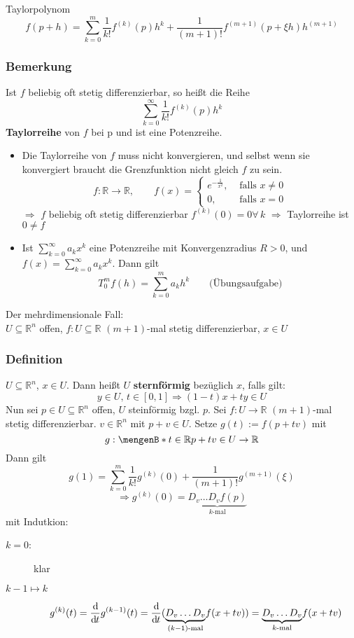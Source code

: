 Taylorpolynom
\[
	f(p+h)=\sum_{k=0}^{m}\frac{1}{k!}f^{(k)}(p)h^k + \frac{1}{(m+1)!}f^{(m+1)}(p+ \xi h)h^{(m+1)}
\]
\subsubsection{Bemerkung} %
\label{ssub:bemerkung}
Ist $f$ beliebig oft stetig differenzierbar, so heißt die Reihe
\[
	\sum^{\infty}_{k=0}\frac{1}{k!}f^{(k)}(p)h^k
\]
{\bfseries Taylorreihe} von $f$ bei p und ist eine Potenzreihe.
\begin{itemize}
	\item Die Taylorreihe von $f$ muss nicht konvergieren, und selbst wenn sie konvergiert braucht die Grenzfunktion nicht gleich $f$ zu sein.
	\[
		f:\mathbb{R}\to \mathbb{R}, \qquad f(x) = \begin{cases}
			e^{-\frac{1}{x^2}}, &\text{ falls }x \neq 0\\ 0, &\text{ falls }x=0 \end{cases}
	\] 
	$\Rightarrow $ $f$ beliebig oft stetig differenzierbar $f^{(k)}(0)=0 \forall\, k$
	$\Rightarrow $ Taylorreihe ist $0 \neq f$
	\item Ist $\sum_{k=0}^{\infty}a_kx^k$ eine Potenzreihe mit Konvergenzradius $R>0$, und $f(x)= \sum_{k=0}^{\infty}a_kx^k$. Dann gilt
	\[
		T_0^mf(h)=\sum_{k=0}^{m}a_kh^k \qquad \text{(Übungsaufgabe)}
	\]
\end{itemize}
Der mehrdimensionale Fall: \\
$ U \subseteq \mathbb{R}^n$ offen, $f:U \subseteq \mathbb{R}$ $(m+1)$-mal stetig differenzierbar, $x \in U$
\subsubsection{Definition} %
\label{ssub:definition}
$U \subseteq \mathbb{R}^n$, $x \in U$. Dann heißt $U$ {\bfseries sternförmig }bezüglich $x$, falls gilt:
\[
	y \in U,\,t \in [0,1] \Rightarrow (1-t)x+ty \in U
\]
Nun sei $p \in U \subseteq \mathbb{R}^n$ offen, $U$ steinförmig bzgl. $p$. Sei $f: U \to \mathbb{R}$ $(m+1)$-mal stetig differenzierbar. $v \in \mathbb{R}^n$ mit $p+v \in U$. Setze $g(t):=f(p+tv)$ mit
\[
	g: \set[t \in \mathbb{R}]{p+tv \in U} \to \mathbb{R}
\]
Dann gilt
\[
	g(1)= \sum_{k=0}^{m}\frac{1}{k!}g^{(k)}(0)+ \frac{1}{(m+1)!}g^{(m+1)}(\xi)
\]
\[
	\Rightarrow g^{(k)}(0)=\underset{k \text{-mal}}{\underbrace{D_v \dots D_vf(p)}}
\]
mit Indutkion:
\begin{description}
	\item[$k=0$:] klar
	\item[$k-1 \mapsto k$] 
	\[
		g^{(k)}(t)=\frac{\mathrm{d}\mkern-1.0mu }{\mathrm{d}\mkern-1.0mu t} g^{(k-1)}(t)= \frac{\mathrm{d}\mkern-1.0mu }{\mathrm{d}\mkern-1.0mu t} (\underset{(k-1) \text{-mal}}{\underbrace{D_v \dots D_v}} f(x+tv))
		= \underset{k \text{-mal}}{\underbrace{D_v \dots D_v}} f(x+tv)
	\] 
\end{description}

